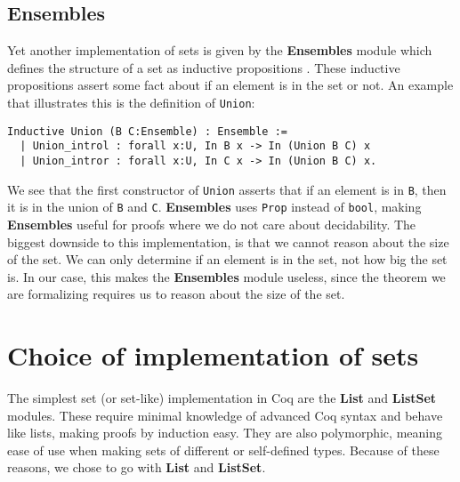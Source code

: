 \subsection{Ensembles}
\label{ssec:ensembles}

Yet another implementation of sets is given by the \textbf{Ensembles} module
which defines the structure of a set as inductive propositions \cite{coqensembles}.
These inductive propositions assert some fact about if an element is in the set or not.
An example that illustrates this is the definition of \lstinline{Union}:

\begin{minipage}{\linewidth}
\begin{lstlisting}[language=Coq, label={lst:union_ensemble}, caption={\lstinline{Union} in \textbf{Ensembles} module}]
Inductive Union (B C:Ensemble) : Ensemble :=
  | Union_introl : forall x:U, In B x -> In (Union B C) x
  | Union_intror : forall x:U, In C x -> In (Union B C) x.
\end{lstlisting}
\end{minipage}

We see that the first constructor of \lstinline{Union} asserts that if an element is in \lstinline{B},
then it is in the union of \lstinline{B} and \lstinline{C}.
\textbf{Ensembles} uses \lstinline{Prop} instead of \lstinline{bool},
making \textbf{Ensembles} useful for proofs where we do not care about decidability.
The biggest downside to this implementation, is that we cannot reason about the size of the set.
We can only determine if an element is in the set, not how big the set is.
In our case, this makes the \textbf{Ensembles} module useless, since the theorem we are formalizing requires us to reason about the
size of the set.

\section{Choice of implementation of sets}
\label{sec:choice_of_implementation_of_sets}

The simplest set (or set-like) implementation in Coq are the \textbf{List} and \textbf{ListSet} modules.
These require minimal knowledge of advanced Coq syntax and behave like lists, making proofs by induction easy.
They are also polymorphic, meaning ease of use when making sets of different or self-defined types.
Because of these reasons, we chose to go with \textbf{List} and \textbf{ListSet}.
